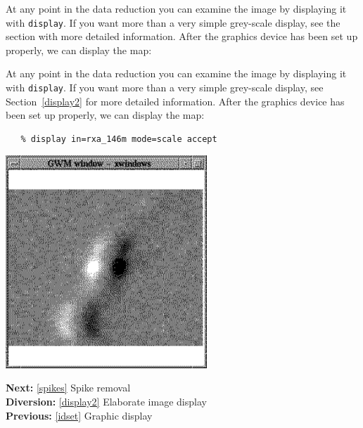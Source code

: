 \documentclass[11pt]{article}
\newcommand{\htmladdimg}[1]{}
\newenvironment{latexonly}{}{}
\newcommand{\htmlref}[2]{#1}
\newcommand{\xref}[3]{#1}
\begin{document}
\begin{htmlonly}
   At any point in the data reduction you can examine the image
   by displaying it with
{\tt \xref{display}{sun95}{DISPLAY}}.
   If you want more than a very simple grey-scale
   display, see the section with
\htmlref{more detailed information.}{display2}
   After the
\htmlref{graphics device has been set up}{idset}
   properly, we can display the map:
\end{htmlonly}
\begin{latexonly}
   At any point in the data reduction you can examine the image
   by displaying it with
{\tt \xref{display}{sun95}{DISPLAY}}.
   If you want more than a very simple grey-scale
   display, see
Section~\ref{display2}
   for more detailed information.
   After the
\htmlref{graphics device has been set up}{idset}
   properly, we can display the map:
\end{latexonly}

\begin{verbatim}
   % display in=rxa_146m mode=scale accept
\end{verbatim}

\begin{latexonly}
\begin{center}
\leavevmode\includegraphics[height=80mm]{sc1_display1}
\end{center}
\end{latexonly}
\htmladdimg{addon/display1.gif}

\begin{latexonly}
{\bf Next:} \ref{spikes} Spike removal\\
{\bf Diversion:} \ref{display2} Elaborate image display\\
{\bf Previous:} \ref{idset} Graphic display\\
\end{latexonly}
\end{document}
